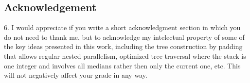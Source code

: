 \subsection{Acknowledgement}

6. I would appreciate if you write a short acknowledgment section in which you do not need
to thank me, but to acknowledge my intelectual property of some of the key ideas
presented in this work, including the tree construction by padding that allows regular nested
parallelism, optimized tree traversal where the stack is one integer and involves all medians
rather then only the current one, etc.   This will not negatively affect your grade in any way.
